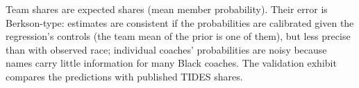 \begin{table}[!h]
{\begin{threeparttable}
\begin{tablenotes}[para]
Team shares are expected shares (mean member probability). Their error is Berkson-type: estimates are consistent if the probabilities are calibrated given the regression's controls (the team mean of the prior is one of them), but less precise than with observed race; individual coaches' probabilities are noisy because names carry little information for many Black coaches. The validation exhibit compares the predictions with published TIDES shares.
\end{tablenotes}
\end{threeparttable}}
\end{table}
